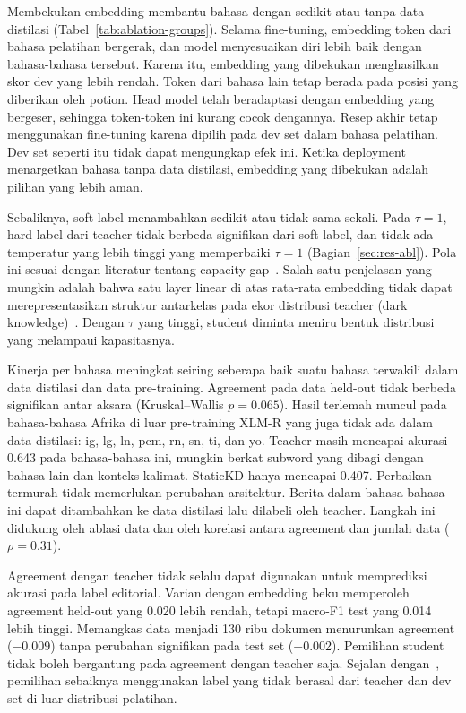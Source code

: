 \documentclass[journal]{IEEEtran}
\begin{document}
Membekukan embedding membantu bahasa dengan sedikit atau tanpa data distilasi (Tabel~\ref{tab:ablation-groups}). Selama fine-tuning, embedding token dari bahasa pelatihan bergerak, dan model menyesuaikan diri lebih baik dengan bahasa-bahasa tersebut. Karena itu, embedding yang dibekukan menghasilkan skor dev yang lebih rendah. Token dari bahasa lain tetap berada pada posisi yang diberikan oleh potion. Head model telah beradaptasi dengan embedding yang bergeser, sehingga token-token ini kurang cocok dengannya. Resep akhir tetap menggunakan fine-tuning karena dipilih pada dev set dalam bahasa pelatihan. Dev set seperti itu tidak dapat mengungkap efek ini. Ketika deployment menargetkan bahasa tanpa data distilasi, embedding yang dibekukan adalah pilihan yang lebih aman.

Sebaliknya, soft label menambahkan sedikit atau tidak sama sekali. Pada $\tau=1$, hard label dari teacher tidak berbeda signifikan dari soft label, dan tidak ada temperatur yang lebih tinggi yang memperbaiki $\tau=1$ (Bagian~\ref{sec:res-abl}). Pola ini sesuai dengan literatur tentang capacity gap~\cite{zhang2025law,wang2026rckd}. Salah satu penjelasan yang mungkin adalah bahwa satu layer linear di atas rata-rata embedding tidak dapat merepresentasikan struktur antarkelas pada ekor distribusi teacher (dark knowledge)~\cite{zhao2022dkd}. Dengan $\tau$ yang tinggi, student diminta meniru bentuk distribusi yang melampaui kapasitasnya.

Kinerja per bahasa meningkat seiring seberapa baik suatu bahasa terwakili dalam data distilasi dan data pre-training. Agreement pada data held-out tidak berbeda signifikan antar aksara (Kruskal--Wallis $p=0.065$). Hasil terlemah muncul pada bahasa-bahasa Afrika di luar pre-training XLM-R yang juga tidak ada dalam data distilasi: ig, lg, ln, pcm, rn, sn, ti, dan yo. Teacher masih mencapai akurasi 0.643 pada bahasa-bahasa ini, mungkin berkat subword yang dibagi dengan bahasa lain dan konteks kalimat. StaticKD hanya mencapai 0.407. Perbaikan termurah tidak memerlukan perubahan arsitektur. Berita dalam bahasa-bahasa ini dapat ditambahkan ke data distilasi lalu dilabeli oleh teacher. Langkah ini didukung oleh ablasi data dan oleh korelasi antara agreement dan jumlah data ($\rho=0.31$).

Agreement dengan teacher tidak selalu dapat digunakan untuk memprediksi akurasi pada label editorial. Varian dengan embedding beku memperoleh agreement held-out yang 0.020 lebih rendah, tetapi macro-F1 test yang 0.014 lebih tinggi. Memangkas data menjadi 130 ribu dokumen menurunkan agreement ($-$0.009) tanpa perubahan signifikan pada test set ($-$0.002). Pemilihan student tidak boleh bergantung pada agreement dengan teacher saja. Sejalan dengan~\cite{stanton2021kd}, pemilihan sebaiknya menggunakan label yang tidak berasal dari teacher dan dev set di luar distribusi pelatihan.
\end{document}
